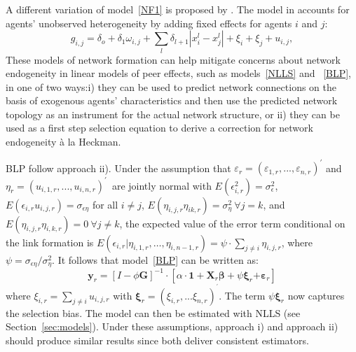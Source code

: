 \documentclass[nojss]{jss}
\begin{document}
A different variation of model~\ref{NF1} is proposed by \cite{Graham:2016}. The model in \cite{Graham:2016} accounts for agents' unobserved heterogeneity by adding fixed effects for agents $i$ and $j$:
\begin{equation}
g_{i,j}=\delta _{o}+\delta _{1}\omega _{i,j}+\sum_{l}\delta
_{l+1}|x_{i}^{l}-x_{j}^{l}|+\xi _{i}+\xi _{j}+u_{i,j},  \label{NF3}
\end{equation}
These models of network formation can help mitigate concerns about network endogeneity in linear models of peer effects, such as models~\ref{NLLS} and ~\ref{BLP}, in one of two ways:i) they can be used to predict network connections on the basis of exogenous agents' characteristics and then use the predicted network topology as an instrument for the actual network structure, or ii) they can be used as a first step selection equation to derive a correction for network endogeneity \`{a} la Heckman.

BLP follow approach ii). Under the assumption that $\varepsilon _{r}=(\varepsilon _{1,r},...,\varepsilon _{n,r})^{\prime}$ and $\eta_{r}=(u_{i,1,r},...,u_{i,n,r})^{\prime}$\ are jointly
normal with $E(\epsilon _{i,r}^{2})=\sigma _{\epsilon }^{2}$, $E(\epsilon_{i,r}u_{i,j,r})=\sigma _{\epsilon \eta }$ for all $i\neq j$, $E(\eta_{i,j,r}\eta _{ik,r})=\sigma _{\eta }^{2}\ \forall j=k$, and $E(\eta_{i,j,r}\eta _{i,k,r})=0\ \forall j\neq k$, the expected value of the error term conditional on the link formation is $E(\epsilon _{i,r}|\eta
_{i,1,r},\dots ,\eta_{i,n-1,r})=\psi \cdot \sum_{j\neq i}\eta _{i,j,r}$, where $\psi =\sigma _{\epsilon \eta }/\sigma _{\eta }^{2}$. It follows that model~\ref{BLP} can be written as:
\begin{equation}
\mathbf{y}_{r}=\left[ I-\phi \boldsymbol{G}\right] ^{-1}\cdot \left[ \alpha
\cdot \mathbf{1}+\boldsymbol{X}_{r}\mathbf{\beta +}\psi \mathbf{\xi }_{r}%
\mathbf{+\varepsilon }_{r}\right]   \label{final_0}
\end{equation}%
where $\xi _{i,r}=\sum_{j\neq i}u_{i,j,r}$ with $\mathbf{\xi }_{r}=(\xi_{i,r},...\xi _{n,r})^{^{\prime }}$. The term $\psi \mathbf{\xi }_{r}$ now captures the selection bias. The model can then be estimated with NLLS (see Section~\ref{sec:models}).
Under these assumptions, approach i) and approach ii) should produce similar results since both deliver consistent estimators.
\end{document}
